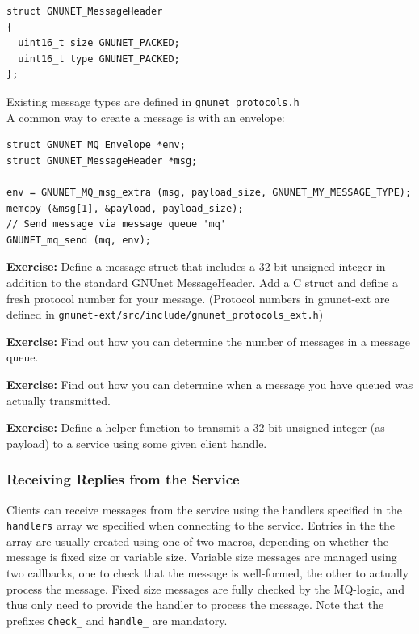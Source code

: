 \documentclass[10pt]{article}
\newcommand{\exercise}[1]{\noindent\begin{boxedminipage}{\textwidth}{\bf Exercise:} #1 \end{boxedminipage}}
\begin{document}
\lstset{language=C}
\begin{lstlisting}
struct GNUNET_MessageHeader
{
  uint16_t size GNUNET_PACKED;
  uint16_t type GNUNET_PACKED;
};
\end{lstlisting}

Existing message types are defined in {\tt gnunet\_protocols.h}\\
A common way to create a message is with an envelope:

\lstset{language=C}
\begin{lstlisting}
struct GNUNET_MQ_Envelope *env;
struct GNUNET_MessageHeader *msg;

env = GNUNET_MQ_msg_extra (msg, payload_size, GNUNET_MY_MESSAGE_TYPE);
memcpy (&msg[1], &payload, payload_size);
// Send message via message queue 'mq'
GNUNET_mq_send (mq, env);
\end{lstlisting}

\exercise{Define a message struct that includes a 32-bit
unsigned integer in addition to the standard GNUnet MessageHeader.
Add a C struct and define a fresh protocol number for your message.
(Protocol numbers in gnunet-ext are defined in \lstinline|gnunet-ext/src/include/gnunet_protocols_ext.h|)}

\exercise{Find out how you can determine the number of messages in a message queue.}

\exercise{Find out how you can determine when a message you have queued was actually transmitted.}

\exercise{Define a helper function to transmit a 32-bit
unsigned integer (as payload) to a service using some given client
handle.}


\subsubsection{Receiving Replies from the Service}

Clients can receive messages from the service using the handlers
specified in the {\tt handlers} array we specified when connecting
to the service.  Entries in the the array are usually created using
one of two macros, depending on whether the message is fixed size
or variable size.  Variable size messages are managed using two
callbacks, one to check that the message is well-formed, the other
to actually process the message.  Fixed size messages are fully
checked by the MQ-logic, and thus only need to provide the handler
to process the message.  Note that the prefixes {\tt check\_}
and {\tt handle\_} are mandatory.
\end{document}
